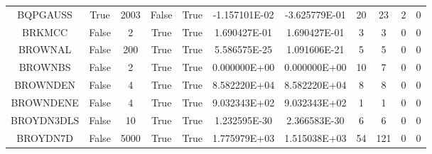 \begin{longtable}{ccccccccccc}
	\cellcolor{default1} BQPGAUSS& \cellcolor{default1} True& \cellcolor{default1} 2003& \cellcolor{default1} False& \cellcolor{default1} True& \cellcolor{poor} -1.157101E-02& \cellcolor{best} -3.625779E-01& \cellcolor{best} 20& \cellcolor{ok} 23& \cellcolor{default1} 2& \cellcolor{default1} 0\\
	\cellcolor{default2} BRKMCC& \cellcolor{default2} False& \cellcolor{default2} 2& \cellcolor{default2} True& \cellcolor{default2} True& \cellcolor{best} 1.690427E-01& \cellcolor{ok} 1.690427E-01& \cellcolor{best} 3& \cellcolor{best} 3& \cellcolor{default2} 0& \cellcolor{default2} 0\\
	\cellcolor{default1} BROWNAL& \cellcolor{default1} False& \cellcolor{default1} 200& \cellcolor{default1} True& \cellcolor{default1} True& \cellcolor{best} 5.586575E-25& \cellcolor{ok} 1.091606E-21& \cellcolor{best} 5& \cellcolor{best} 5& \cellcolor{default1} 0& \cellcolor{default1} 0\\
	\cellcolor{default2} BROWNBS& \cellcolor{default2} False& \cellcolor{default2} 2& \cellcolor{default2} True& \cellcolor{default2} True& \cellcolor{best} 0.000000E+00& \cellcolor{best} 0.000000E+00& \cellcolor{ok} 10& \cellcolor{best} 7& \cellcolor{default2} 0& \cellcolor{default2} 0\\
	\cellcolor{default1} BROWNDEN& \cellcolor{default1} False& \cellcolor{default1} 4& \cellcolor{default1} True& \cellcolor{default1} True& \cellcolor{ok} 8.582220E+04& \cellcolor{best} 8.582220E+04& \cellcolor{best} 8& \cellcolor{best} 8& \cellcolor{default1} 0& \cellcolor{default1} 0\\
	\cellcolor{default2} BROWNDENE& \cellcolor{default2} False& \cellcolor{default2} 4& \cellcolor{default2} True& \cellcolor{default2} True& \cellcolor{ok} 9.032343E+02& \cellcolor{best} 9.032343E+02& \cellcolor{best} 1& \cellcolor{best} 1& \cellcolor{default2} 0& \cellcolor{default2} 0\\
	\cellcolor{default1} BROYDN3DLS& \cellcolor{default1} False& \cellcolor{default1} 10& \cellcolor{default1} True& \cellcolor{default1} True& \cellcolor{best} 1.232595E-30& \cellcolor{ok} 2.366583E-30& \cellcolor{best} 6& \cellcolor{best} 6& \cellcolor{default1} 0& \cellcolor{default1} 0\\
	\cellcolor{default2} BROYDN7D& \cellcolor{default2} False& \cellcolor{default2} 5000& \cellcolor{default2} True& \cellcolor{default2} True& \cellcolor{poor} 1.775979E+03& \cellcolor{best} 1.515038E+03& \cellcolor{best} 54& \cellcolor{poor} 121& \cellcolor{default2} 0& \cellcolor{default2} 0\\

\end{longtable}
